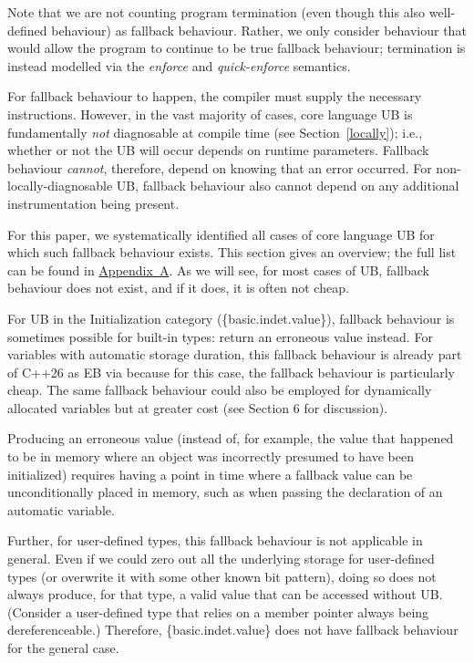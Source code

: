 Note that we are not counting program termination (even though this also well-defined behaviour) as fallback behaviour. Rather, we only consider behaviour that would allow the program to continue to be true fallback behaviour; termination is instead modelled via the \emph{enforce} and \emph{quick-enforce} semantics.

For fallback behaviour to happen, the compiler must supply the necessary instructions. However, in the vast majority of cases, core language UB is fundamentally \emph{not} diagnosable at compile time (see Section~\ref{locally}); i.e., whether or not the UB will occur depends on runtime parameters. Fallback behaviour \emph{cannot}, therefore, depend on knowing that an error occurred. For non-locally-diagnosable UB, fallback behaviour also cannot depend on any additional instrumentation being present.

For this paper, we systematically identified all cases of core language UB for which such fallback behaviour exists. This section gives an overview; the full list can be found in \hyperref[appendix]{Appendix~A}. As we will see, for most cases of UB, fallback behaviour does not exist, and if it does, it is often not cheap.

For UB in the Initialization category (\{basic.indet.value\}), fallback behaviour is sometimes possible for built-in types: return an erroneous value instead. For variables with automatic storage duration, this fallback behaviour is already part of C++26 as EB via \cite{P2795R5} because for this case, the fallback behaviour is particularly cheap. The same fallback behaviour could also be employed for dynamically allocated variables but at greater cost (see \cite{P2723R1} Section 6 for discussion).

Producing an erroneous value (instead of, for example, the value that happened to be in memory where an object was incorrectly presumed to have been initialized) requires having a point in time where a fallback value can be unconditionally placed in memory, such as when passing the declaration of an automatic variable.

Further, for user-defined types, this fallback behaviour is not applicable in general. Even if we could zero out all the underlying storage for user-defined types (or overwrite it with some other known bit pattern), doing so does not always produce, for that type, a valid value that can be accessed without UB. (Consider a user-defined type that relies on a member pointer always being dereferenceable.) Therefore, \{basic.indet.value\} does not have fallback behaviour for the general case.

